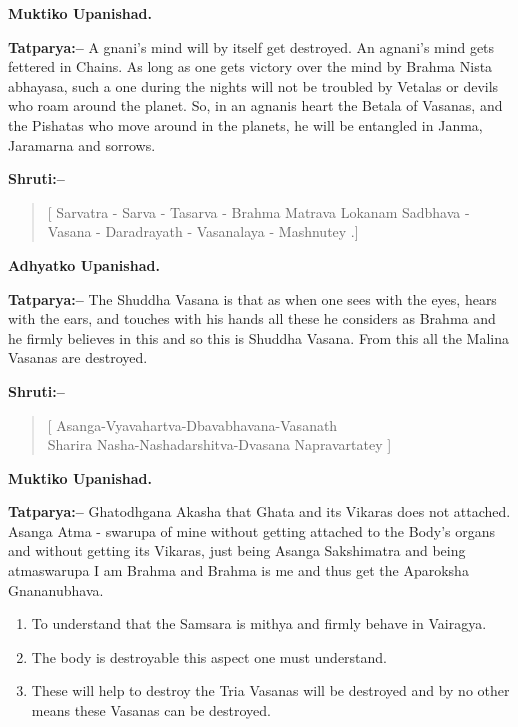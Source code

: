 \begin{flushright}
\textbf{Muktiko Upanishad.}
\end{flushright}

\textbf{Tatparya:–} A gnani's mind will by itself get destroyed. An agnani's mind gets fettered in Chains. As long as one gets victory over the mind by Brahma Nista abhayasa, such a one during the nights will not be troubled by Vetalas or devils who roam around the planet. So, in an agnanis heart the Betala of Vasanas, and the Pishatas who move around in the planets, he will be entangled in Janma, Jaramarna and sorrows.

\textbf{Shruti:–}

\begin{verse}
[ Sarvatra - Sarva - Tasarva - Brahma Matrava Lokanam Sadbhava - Vasana - Daradrayath - Vasanalaya - Mashnutey .]
\end{verse}

\begin{flushright}
\textbf{Adhyatko Upanishad.}
\end{flushright}

\textbf{Tatparya:–} The Shuddha Vasana is that as when one sees with the eyes, hears with the ears, and touches with his hands all these he considers as Brahma and he firmly believes in this and so this is Shuddha Vasana. From this all the Malina Vasanas are destroyed.

\textbf{Shruti:–}

\begin{verse}
[ Asanga-Vyavahartva-Dbavabhavana-Vasanath \\ Sharira Nasha-Nashadarshitva-Dvasana Napravartatey ]
\end{verse}

\begin{flushright}
\textbf{Muktiko Upanishad.}
\end{flushright}

\textbf{Tatparya:–} Ghatodhgana Akasha that Ghata and its Vikaras does not attached. Asanga Atma - swarupa of mine without getting attached to the Body's organs and without getting its Vikaras, just being Asanga Sakshimatra and being atmaswarupa I am Brahma and Brahma is me and thus get the Aparoksha Gnananubhava.

\begin{enumerate}
\item To understand that the Samsara is mithya and firmly behave in Vairagya.

 \item The body is destroyable this aspect one must understand.

 \item These will help to destroy the Tria Vasanas will be destroyed and by no other means these Vasanas can be destroyed.

\end{enumerate}

